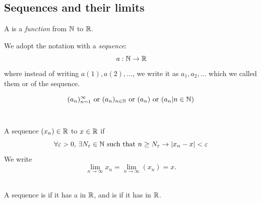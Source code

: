 \documentclass[a4paper,12pt]{article}
\begin{document}
\subsection{Sequences and their limits}

\begin{definition}
    A  is a \textit{function} from $\mathbb{N}$ to $\mathbb{R}$.
\end{definition}


We adopt the notation with a \textit{sequence}:
\[\,a:\mathbb{N}\rightarrow\mathbb{R}\]
where instead of writing \(a(1), a(2), \dots\), we write it as \(a_1, a_2, \dots\) which we called them 
 or  of the sequence.\\

\begin{notation}

\[(a_n)_{n=1}^\infty  \text{ or }  (a_n)_{n\in\mathbb{N}}  \text{ or }  (a_n)  \text{ or }  (a_n|n\in \mathbb{N})\]\\
\end{notation}

\begin{definition}
    A sequence \((x_n)\in\mathbb{R}\)  to \(x\in\mathbb{R}\) if 
    \[\forall \varepsilon >0,\, \exists N_\varepsilon \in \mathbb{N} \text{ such that }n\ge N_\varepsilon \rightarrow\left\lvert x_n - x\right\rvert <\varepsilon\]
    We write \[\lim_{n\to\infty}x_n = \lim_{n\to\infty}(x_n) = x.\]\\
\end{definition}

\begin{definition}
    A sequence is  if it has a  in \(\mathbb{R}\), and is  if it 
    has  in $\mathbb{R}$.\\
\end{definition}
\end{document}
